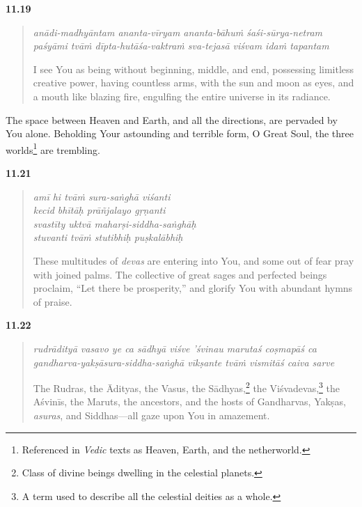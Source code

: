 \par\noindent\textbf{11.19}\par
\begin{verse}
\textit{anādi-madhyāntam ananta-vīryam ananta-bāhuṁ śaśi-sūrya-netram} \\
\textit{paśyāmi tvāṁ dīpta-hutāśa-vaktraṁ sva-tejasā viśvam idaṁ tapantam}

\noindent I see You as being without beginning, middle, and end, possessing limitless creative power, having countless arms, with the sun and moon as eyes, and a mouth like blazing fire, engulfing the entire universe in its radiance.
\end{verse}
\par


{The space between Heaven and Earth, and all the directions, are pervaded by You alone. Beholding Your astounding and terrible form, O Great Soul, the three worlds\footnote{Referenced in \textit{Vedic} texts as Heaven, Earth, and the netherworld.} are trembling.}


\par\noindent\textbf{11.21}\par
\begin{verse}
\textit{amī hi tvāṁ sura-saṅghā viśanti} \\
\textit{kecid bhītāḥ prāñjalayo gṛṇanti} \\
\textit{svastīty uktvā maharṣi-siddha-saṅghāḥ} \\
\textit{stuvanti tvāṁ stutibhiḥ puṣkalābhiḥ}

\noindent These multitudes of \textit{devas} are entering into You, and some out of fear pray with joined palms. The collective of great sages and perfected beings proclaim, \enquote{Let there be prosperity,} and glorify You with abundant hymns of praise.
\end{verse}
\par



\par\noindent\textbf{11.22}\par
\begin{verse}
\textit{rudrādityā vasavo ye ca sādhyā viśve ’śvinau marutaś coṣmapāś ca} \\
\textit{gandharva-yakṣāsura-siddha-saṅghā vīkṣante tvāṁ vismitāś caiva sarve}

\noindent The Rudras, the Ādityas, the Vasus, the Sādhyas,\footnote{Class of divine beings dwelling in the celestial planets.} the Viśvadevas,\footnote{A term used to describe all the celestial deities as a whole.} the Aśvinīs, the Maruts, the ancestors, and the hosts of Gandharvas, Yakṣas, \textit{asuras}, and Siddhas---all gaze upon You in amazement.
\end{verse}
\par



